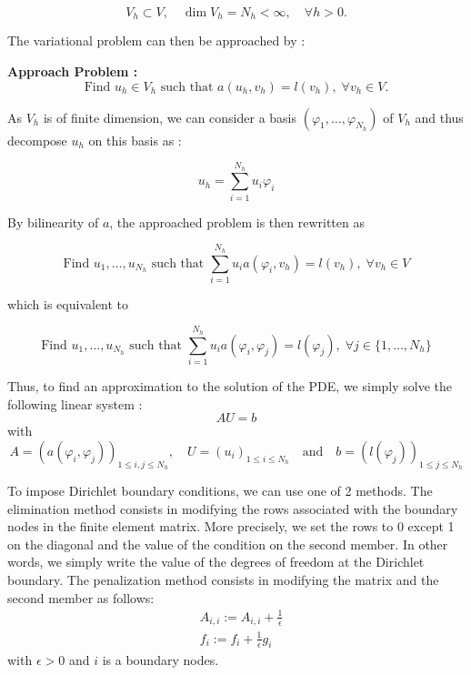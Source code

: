 \begin{equation*}
	V_h\subset V, \quad \dim V_h = N_h<\infty, \quad \forall h>0.
\end{equation*}

The variational problem can then be approached by :

\textbf{Approach Problem :}
\begin{equation*}
	\text{Find } u_h\in V_h \text{ such that } a(u_h,v_h)=l(v_h), \;\forall v_h\in V.
\end{equation*}

As $V_h$ is of finite dimension, we can consider a basis $(\varphi_1,\dots,\varphi_{N_h})$ of $V_h$ and thus decompose $u_h$ on this basis as :

\begin{equation}
	\label{decomp1}
	u_h=\sum_{i=1}^{N_h}u_i\varphi_i	
\end{equation}

By bilinearity of $a$, the approached problem is then rewritten as

\begin{equation*}
	\text{Find } u_1,\dots,u_{N_h} \text{ such that } \sum_{i=1}^{N_h}u_i a(\varphi_i,v_h)=l(v_h), \;\forall v_h\in V 
\end{equation*}

which is equivalent to

\begin{equation*}
	\text{Find } u_1,\dots,u_{N_h} \text{ such that } \sum_{i=1}^{N_h}u_i a(\varphi_i,\varphi_j)=l(\varphi_j), \;\forall j\in \{1,\dots,N_h\}
\end{equation*}

Thus, to find an approximation to the solution of the PDE, we simply solve the following linear system :
\begin{equation*}
	AU=b
\end{equation*}
with
\begin{equation*}
	A=(a(\varphi_i,\varphi_j))_{1\le i,j\le N_h}, \quad U=(u_i)_{1\le i\le N_h} \quad \text{and} \quad b=(l(\varphi_j))_{1\le j\le N_h}
\end{equation*}

\begin{Rem}
	To impose Dirichlet boundary conditions, we can use one of 2 methods. The elimination method consists in modifying the rows associated with the boundary nodes in the finite element matrix. More precisely, we set the rows to 0 except 1 on the diagonal and the value of the condition on the second member. In other words, we simply write the value of the degrees of freedom at the Dirichlet boundary. The penalization method consists in modifying the matrix and the second member as follows:
	\begin{align*}
		&A_{i,i} := A_{i,i}+\frac{1}{\epsilon} \\
		&f_i := f_i + \frac{1}{\epsilon}g_i
	\end{align*}
	with $\epsilon >0$ and $i$ is a boundary nodes.
\end{Rem}

